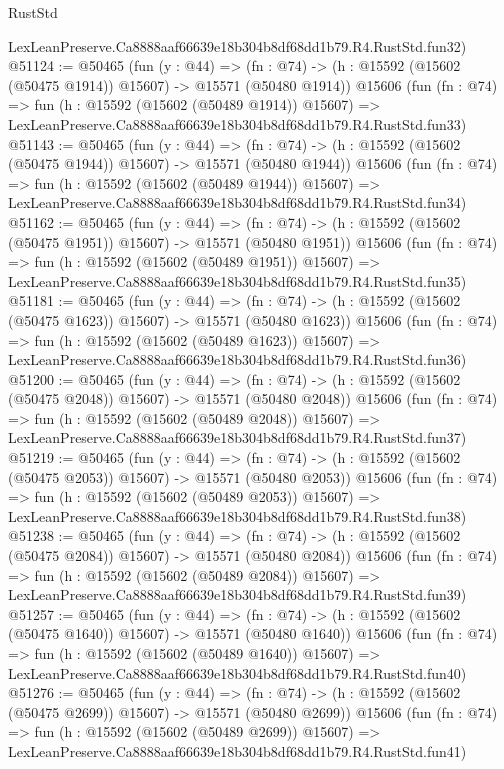 \begin{lexlean}{RustStd}
\begin{coremodule}
    LexLeanPreserve.Ca8888aaf66639e18b304b8df68dd1b79.R4.RustStd.fun32)
@51124 := @50465
    (fun (y : @44) =>
    (fn : @74) -> (h : @15592 (@15602 (@50475 @1914)) @15607) -> @15571 (@50480 @1914))
    @15606
    (fun (fn : @74) =>
    fun (h : @15592 (@15602 (@50489 @1914)) @15607) =>
    LexLeanPreserve.Ca8888aaf66639e18b304b8df68dd1b79.R4.RustStd.fun33)
@51143 := @50465
    (fun (y : @44) =>
    (fn : @74) -> (h : @15592 (@15602 (@50475 @1944)) @15607) -> @15571 (@50480 @1944))
    @15606
    (fun (fn : @74) =>
    fun (h : @15592 (@15602 (@50489 @1944)) @15607) =>
    LexLeanPreserve.Ca8888aaf66639e18b304b8df68dd1b79.R4.RustStd.fun34)
@51162 := @50465
    (fun (y : @44) =>
    (fn : @74) -> (h : @15592 (@15602 (@50475 @1951)) @15607) -> @15571 (@50480 @1951))
    @15606
    (fun (fn : @74) =>
    fun (h : @15592 (@15602 (@50489 @1951)) @15607) =>
    LexLeanPreserve.Ca8888aaf66639e18b304b8df68dd1b79.R4.RustStd.fun35)
@51181 := @50465
    (fun (y : @44) =>
    (fn : @74) -> (h : @15592 (@15602 (@50475 @1623)) @15607) -> @15571 (@50480 @1623))
    @15606
    (fun (fn : @74) =>
    fun (h : @15592 (@15602 (@50489 @1623)) @15607) =>
    LexLeanPreserve.Ca8888aaf66639e18b304b8df68dd1b79.R4.RustStd.fun36)
@51200 := @50465
    (fun (y : @44) =>
    (fn : @74) -> (h : @15592 (@15602 (@50475 @2048)) @15607) -> @15571 (@50480 @2048))
    @15606
    (fun (fn : @74) =>
    fun (h : @15592 (@15602 (@50489 @2048)) @15607) =>
    LexLeanPreserve.Ca8888aaf66639e18b304b8df68dd1b79.R4.RustStd.fun37)
@51219 := @50465
    (fun (y : @44) =>
    (fn : @74) -> (h : @15592 (@15602 (@50475 @2053)) @15607) -> @15571 (@50480 @2053))
    @15606
    (fun (fn : @74) =>
    fun (h : @15592 (@15602 (@50489 @2053)) @15607) =>
    LexLeanPreserve.Ca8888aaf66639e18b304b8df68dd1b79.R4.RustStd.fun38)
@51238 := @50465
    (fun (y : @44) =>
    (fn : @74) -> (h : @15592 (@15602 (@50475 @2084)) @15607) -> @15571 (@50480 @2084))
    @15606
    (fun (fn : @74) =>
    fun (h : @15592 (@15602 (@50489 @2084)) @15607) =>
    LexLeanPreserve.Ca8888aaf66639e18b304b8df68dd1b79.R4.RustStd.fun39)
@51257 := @50465
    (fun (y : @44) =>
    (fn : @74) -> (h : @15592 (@15602 (@50475 @1640)) @15607) -> @15571 (@50480 @1640))
    @15606
    (fun (fn : @74) =>
    fun (h : @15592 (@15602 (@50489 @1640)) @15607) =>
    LexLeanPreserve.Ca8888aaf66639e18b304b8df68dd1b79.R4.RustStd.fun40)
@51276 := @50465
    (fun (y : @44) =>
    (fn : @74) -> (h : @15592 (@15602 (@50475 @2699)) @15607) -> @15571 (@50480 @2699))
    @15606
    (fun (fn : @74) =>
    fun (h : @15592 (@15602 (@50489 @2699)) @15607) =>
    LexLeanPreserve.Ca8888aaf66639e18b304b8df68dd1b79.R4.RustStd.fun41)

\end{coremodule}
\end{lexlean}
